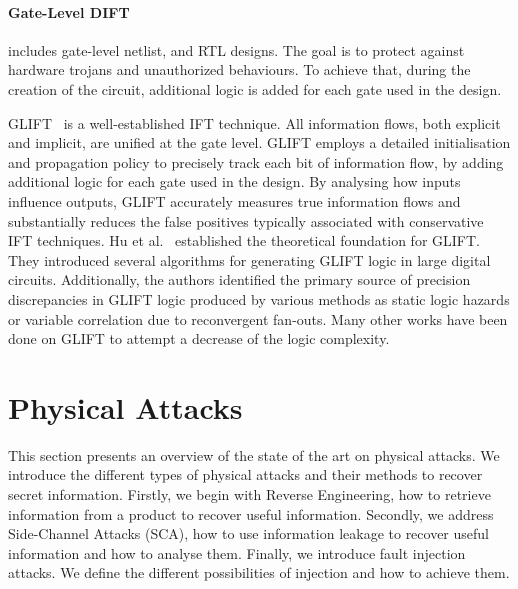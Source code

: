 \paragraph{Gate-Level DIFT} includes gate-level netlist, and RTL designs. The goal is to protect against hardware trojans and unauthorized behaviours. To achieve that, during the creation of the circuit, additional logic is added for each gate used in the design.

GLIFT~\cite{TWMMCS-09-asplos} is a well-established IFT technique. All information flows, both explicit and implicit, are unified at the gate level. GLIFT employs a detailed initialisation and propagation policy to precisely track each bit of information flow, by adding additional logic for each gate used in the design. By analysing how inputs influence outputs, GLIFT accurately measures true information flows and substantially reduces the false positives typically associated with conservative IFT techniques.
Hu et al.~\cite{HOITSMK-11-tcad} established the theoretical foundation for GLIFT. They introduced several algorithms for generating GLIFT logic in large digital circuits. Additionally, the authors identified the primary source of precision discrepancies in GLIFT logic produced by various methods as static logic hazards or variable correlation due to reconvergent fan-outs. Many other works have been done on GLIFT to attempt a decrease of the logic complexity.

\section{Physical Attacks}
\label{section:physicalAttacks}

This section presents an overview of the state of the art on physical attacks. We introduce the different types of physical attacks and their methods to recover secret information. Firstly, we begin with Reverse Engineering, how to retrieve information from a product to recover useful information.
Secondly, we address Side-Channel Attacks (SCA), how to use information leakage to recover useful information and how to analyse them.
Finally, we introduce fault injection attacks. We define the different possibilities of injection and how to achieve them.

